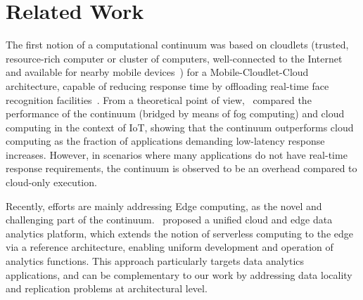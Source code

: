 \section{Related Work}
\label{sec:related}

The first notion of a computational continuum was based on cloudlets (trusted, resource-rich computer or cluster of computers, well-connected to the Internet and available for nearby mobile devices~\cite{Satyanarayanan09cloudlets}) for a Mobile-Cloudlet-Cloud architecture, capable of reducing response time by offloading real-time face recognition facilities~\cite{Soyata:2012}. From a theoretical point of view,~\cite{sarkar2015assessment} compared the performance of the continuum (bridged by means of fog computing) and cloud computing in the context of IoT, showing that the continuum outperforms cloud computing as the fraction of applications demanding low-latency response increases. However, in scenarios where many applications do not have real-time response requirements, the continuum is observed to be an overhead compared to cloud-only execution.


Recently, efforts are mainly addressing Edge computing, as the novel and challenging part of the continuum.~\cite{Nastic17ServerlessDataAnalytics} proposed a unified cloud and edge data analytics platform, which extends the notion of serverless computing to the edge via a reference architecture, enabling uniform development and operation of analytics functions. This approach particularly targets data analytics applications, and can be complementary to our work by addressing data locality and replication problems at architectural level.


